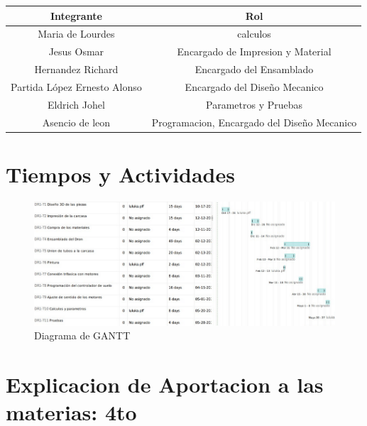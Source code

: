 \documentclass[11pt,a4paper]{article}
\begin{document}
\begin{tabular}{|c|c|}

\hline
\textbf{Integrante} & \textbf{Rol} \\ \hline
Maria de Lourdes  & calculos \\ \hline
Jesus Osmar & Encargado de Impresion y Material \\ \hline
Hernandez Richard & Encargado del Ensamblado \\ \hline
Partida López Ernesto Alonso & Encargado del Diseño Mecanico \\ \hline
Eldrich Johel & Parametros y Pruebas \\ \hline
Asencio de leon & Programacion, Encargado del Diseño Mecanico\\ \hline
\end{tabular}

\newpage 

\section{Tiempos y Actividades}

\begin{figure}[h]
\centering
\includegraphics[scale=.5]{FFFFFFFFFF2}
\caption{Diagrama de GANTT}
\end{figure}

\section{Explicacion de Aportacion a las materias: 4to}
\end{document}
